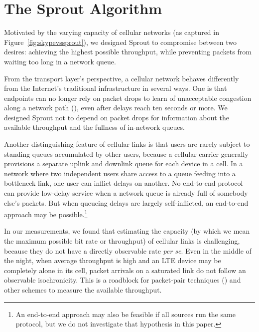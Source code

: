 \section{The Sprout Algorithm}
\label{s:sprout}

Motivated by the varying capacity of cellular networks (as captured in
Figure~\ref{fig:skypevssprout}), we designed Sprout to compromise
between two desires: achieving the highest possible throughput, while
preventing packets from waiting too long in a network queue.

From the transport layer's perspective, a cellular network behaves
differently from the Internet's traditional infrastructure in several
ways. One is that endpoints can no longer rely on packet drops to
learn of unacceptable congestion along a network path
(\cite{bufferbloat}), even after delays reach ten seconds or more. We
designed Sprout not to depend on packet drops for information about
the available throughput and the fullness of in-network queues.

Another distinguishing feature of cellular links is that users are
rarely subject to standing queues accumulated by other users, because
a cellular carrier generally provisions a separate uplink and downlink
queue for each device in a cell. In a network where two independent
users share access to a queue feeding into a bottleneck link, one user
can inflict delays on another. No end-to-end protocol can provide
low-delay service when a network queue is already full of somebody
else's packets. But when queueing delays are largely self-inflicted,
an end-to-end approach may be possible.\footnote{An end-to-end
  approach may also be feasible if all sources run the same protocol,
  but we do not investigate that hypothesis in this paper.}

In our measurements, we found that estimating the capacity (by which
we mean the maximum possible bit rate or throughput) of cellular links
is challenging, because they do not have a directly observable rate
{\em per se}. Even in the middle of the night, when average throughput
is high and an LTE device may be completely alone in its cell, packet
arrivals on a saturated link do not follow an observable
isochronicity. This is a roadblock for packet-pair techniques
(\cite{packetpair}) and other schemes to measure the available
throughput.

